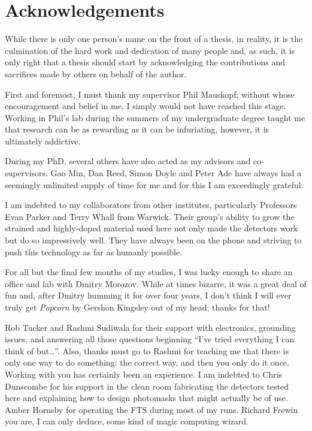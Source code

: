 \chapter*{Acknowledgements}
While there is only one person's name on the front of a thesis, in reality, it is the culmination of the hard work and dedication of many people and, as such, it is only right that a thesis should start by acknowledging the contributions and sacrifices made by others on behalf of the author.
\par
First and foremost, I must thank my supervisor Phil Mauskopf; without whose encouragement and belief in me, I simply would not have reached this stage.  Working in Phil's lab during the summers of my undergraduate degree taught me that research can be as rewarding  as it can be infuriating, however, it is ultimately addictive. 
\par
During my PhD, several others have also acted as my advisors and co-supervisors. Gao Min, Dan Reed, Simon Doyle and Peter Ade have always had a seemingly unlimited supply of time for me and for this I am exceedingly grateful.
\par
I am indebted to my collaborators from other institutes, particularly Professors Evan Parker and Terry Whall from Warwick. Their group's ability to grow the strained and highly-doped material used here not only made the detectors work but do so impressively well. They have always been on the phone and striving to push this technology as far as humanly possible.
\par
For all but the final few months of my studies, I was lucky enough to share an office and lab with Dmitry Morozov. While at times bizarre, it was a great deal of fun and, after Dmitry humming it for over four years, I don't think I will ever truly get \textit{Popcorn} by Gershon Kingsley out of my head; thanks for that!
\par 
Rob Tucker and Rashmi Sudiwala for their support with electronics, grounding issues, and answering all those questions beginning ``I've tried everything I can think of but\ldots''. Also, thanks must go to Rashmi for teaching me that there is only one way to do something: the correct way, and then you only do it once. Working with you has certainly been an experience. I am indebted to Chris Dunscombe for his support in the clean room fabricating the detectors tested here and explaining how to design photomasks that might actually be of use. Amber Hornsby for operating the FTS during most of my runs. Richard Frewin you are, I can only deduce, some kind of magic computing wizard.
